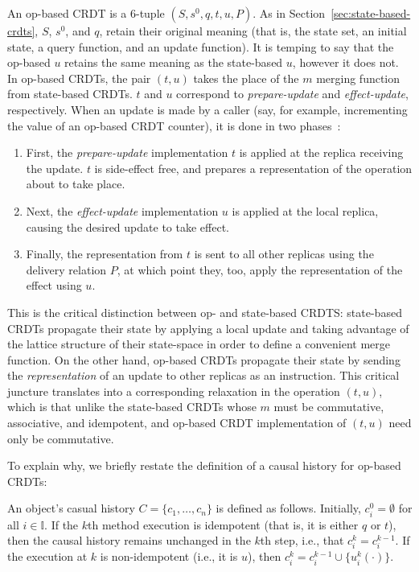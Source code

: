 An op-based CRDT is a $6$-tuple $(S, s^0, q, t, u, P)$. As in
Section~\ref{sec:state-based-crdts}, $S$, $s^0$, and $q$, retain their
original meaning (that is, the state set, an initial state, a query function,
and an update function). It is temping to say that the op-based $u$ retains the
same meaning as the state-based $u$, however it does not. In op-based CRDTs,
the pair $(t,u)$ takes the place of the $m$ merging function from state-based
CRDTs. $t$ and $u$ correspond to \textit{prepare-update} and
\textit{effect-update}, respectively. When an update is made by a caller (say,
for example, incrementing the value of an op-based CRDT counter), it is done in
two phases~\citep{shapiro11}:
\begin{enumerate}
  \item First, the \textit{prepare-update} implementation $t$ is applied at the
    replica receiving the update. $t$ is side-effect free, and prepares a
    representation of the operation about to take place.
  \item Next, the \textit{effect-update} implementation $u$ is applied at the
    local replica, causing the desired update to take effect.
  \item Finally, the representation from $t$ is sent to all other replicas using
    the delivery relation $P$, at which point they, too, apply the
    representation of the effect using $u$.
\end{enumerate}

This is the critical distinction between op- and state-based CRDTS:
state-based CRDTs propagate their state by applying a local update and taking
advantage of the lattice structure of their state-space in order to define a
convenient merge function. On the other hand, op-based CRDTs propagate their
state by sending the \textit{representation} of an update to other replicas as
an instruction. This critical juncture translates into a corresponding
relaxation in the operation $(t, u)$, which is that unlike the state-based CRDTs
whose $m$ must be commutative, associative, and idempotent, and op-based CRDT
implementation of $(t, u)$ need only be commutative.

To explain why, we briefly restate the definition of a causal history for
op-based CRDTs:

\begin{definition}
An object's casual history $C = \{ c_1, \ldots, c_n \}$ is defined as follows.
Initially, $c_i^0 = \emptyset$ for all $i \in \mathbb{I}$. If the $k$th method
execution is idempotent (that is, it is either $q$ or $t$), then the causal
history remains unchanged in the $k$th step, i.e., that $c_i^k = c_i^{k-1}$. If
the execution at $k$ is non-idempotent (i.e., it is $u$), then $c_i^{k} =
c_i^{k-1} \cup \{ u_i^k(\cdot) \}$.
\end{definition}

